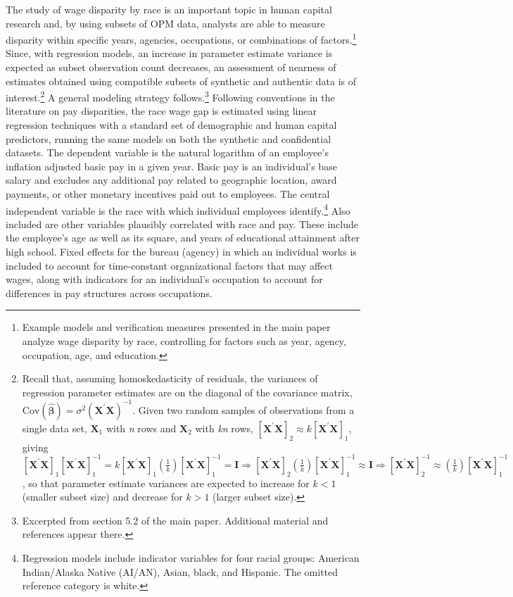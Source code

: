 \documentclass[10pt, letterpaper]{article}
\newcommand{\mtm}[2]{\bm{#1}^{\prime}\bm{#2}}
\newcommand{\mest}[1]{\hat{\bm{#1}}}
\begin{document}
\begin{spacing}{1.0}
The study of wage disparity by race is an important topic in human capital research and, by using subsets of OPM data, analysts are able to  measure disparity within specific years, agencies, occupations, or combinations of factors.\footnote{Example models and verification measures presented in the main paper analyze wage disparity by race, controlling for factors such as year, agency, occupation, age, and education.}  Since, with regression models, an increase in parameter estimate variance is expected as subset observation count decreases, an assessment of nearness of estimates obtained using compatible subsets of synthetic and authentic data is of interest.\footnote{Recall that, assuming homoskedasticity of residuals, the variances of regression parameter estimates are on the diagonal of the covariance matrix,  $\text{Cov}(\mest{\beta})=\sigma^2(\mtm{X}{X})^{-1}$.  Given two random samples of observations from a single data set, $\bm{X}_1$ with \textit{n} rows and $\bm{X}_2$ with \textit{kn} rows, $[\mtm{X}{X}]_2\approx k[\mtm{X}{X}]_1$, giving $[\mtm{X}{X}]_1[\mtm{X}{X}]^{-1}_1 = k[\mtm{X}{X}]_1(\frac{1}{k})[\mtm{X}{X}]^{-1}_1 = \textbf{I} \Rightarrow [\mtm{X}{X}]_2(\frac{1}{k})[\mtm{X}{X}]^{-1}_1 \approx \textbf{I} \Rightarrow [\mtm{X}{X}]^{-1}_2 \approx (\frac{1}{k})[\mtm{X}{X}]^{-1}_1$, so that parameter estimate variances are expected to increase for $k<1$ (smaller subset size) and decrease for $k>1$ (larger subset size).}  A general modeling strategy follows.\footnote{Excerpted from section 5.2 of the main paper.  Additional material and references appear there.}  
Following conventions in the literature on pay disparities, the race wage gap is estimated using linear regression techniques with a standard set of demographic and human capital predictors, running the same models on both the synthetic and confidential datasets.  The dependent variable is the natural logarithm of an employee's inflation adjusted basic pay in a given year. Basic pay is an individual's base salary and excludes any additional pay related to geographic location, award payments, or other monetary incentives paid out to employees.  The central independent variable is the race with which individual employees identify.\footnote{Regression models include indicator variables for four racial groups: American Indian/Alaska Native (AI/AN), Asian, black, and Hispanic. The omitted reference category is white.}  Also included are other variables plausibly correlated with race and pay. These include the employee's age as well as its square, and years of educational attainment after high school.  Fixed effects for the bureau (agency) in which an individual works is included to account for time-constant organizational factors that may affect wages, along with indicators for an individual's occupation to account for differences in pay structures across occupations.\\


\end{spacing}
\end{document}
